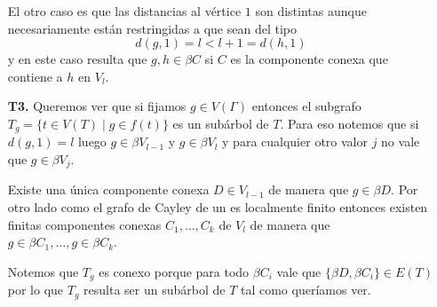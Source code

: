 \documentclass[tesis.tex]{subfiles}
\begin{document}
\begin{obs}
\begin{enumerate}
		
		El otro caso es que las distancias al vértice $1$ son distintas aunque necesariamente están restringidas a que sean del tipo
		\[
			d(g,1)= l < l+1 = d(h,1)
		\] 
		y en este caso resulta que $g,h \in \beta C$ si $C$ es la componente conexa que contiene a $h$ en $V_l$.
		
		\item[\textbf{T3.}] Queremos ver que si fijamos $g \in V(\Gamma)$ entonces el subgrafo $T_{g} = \{ t \in V(T) \mid g \in f(t) \} $ es un subárbol de $T$.
		Para eso notemos que si $d(g,1) = l$ luego $g \in \beta V_{l-1}$ y $g \in \beta V_{l}$ y para cualquier otro valor $j$ no vale que $g \in \beta V_{j}$.
		
		Existe una única componente conexa $D \in V_{l-1}$ de manera que $g \in \beta D$. 
		Por otro lado como el grafo de Cayley de un \fg es localmente finito entonces existen finitas componentes conexas $C_{1}, \dots, C_{k}$ de $V_{l}$ de manera que $g \in \beta C_{1}, \dots, g \in \beta C_{k}$.

		Notemos que $T_{g}$ es conexo porque para todo $\beta C_{i}$ vale que $\{ \beta D, \beta C_{i} \} \in E(T)$ por lo que $T_{g}$ resulta ser un subárbol de $T$ tal como queríamos ver.
		 
	\end{enumerate}
\end{obs}
\end{document}
